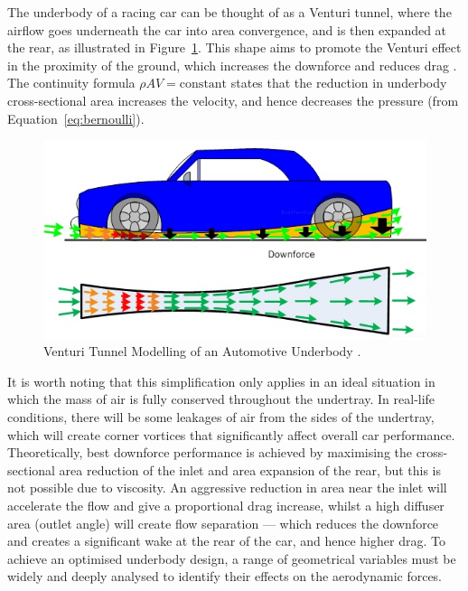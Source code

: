 \noindent The underbody of a racing car can be thought of as a Venturi tunnel, where the airflow goes underneath the car into area convergence, and is then expanded at the rear, as illustrated in Figure~\ref{fig:venturi_tunnel_car}. This shape aims to promote the Venturi effect in the proximity of the ground, which increases the downforce and reduces drag \cite{Katz2005AerodynamicsCars}. The continuity formula $\rho AV = \text{constant}$ states that the reduction in underbody cross-sectional area increases the velocity, and hence decreases the pressure (from Equation~\ref{eq:bernoulli}).

\begin{figure}[!ht]
    \centering
    \includegraphics[scale=0.8]{Figures/venturi_tunnel.jpg}
    \caption{Venturi Tunnel Modelling of an Automotive Underbody \cite{Anonymous2020RaceDesign}.}
    \label{fig:venturi_tunnel_car}
\end{figure}

\noindent It is worth noting that this simplification only applies in an ideal situation in which the mass of air is fully conserved throughout the undertray. In real-life conditions, there will be some leakages of air from the sides of the undertray, which will create corner vortices that significantly affect overall car performance. Theoretically, best downforce performance is achieved by maximising the cross-sectional area reduction of the inlet and area expansion of the rear, but this is not possible due to viscosity. An aggressive reduction in area near the inlet will accelerate the flow and give a proportional drag increase, whilst a high diffuser area (outlet angle) will create flow separation --- which reduces the downforce and creates a significant wake at the rear of the car, and hence higher drag. To achieve an optimised underbody design, a range of geometrical variables must be widely and deeply analysed to identify their effects on the aerodynamic forces.

